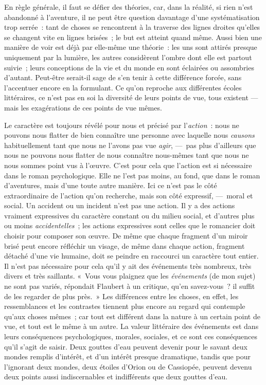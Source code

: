 \documentclass[french,twoside]{book} %
\begin{document}
En règle générale, il faut se défier des théories, car, dans la réalité, si rien n’est abandonné à l’aventure, il ne peut être question davantage d’une systématisation trop serrée : tant de choses se rencontrent à la traverse des lignes droites qu’elles se changent vite en lignes brisées ; le but est atteint quand même. Aussi bien une manière de voir est déjà par elle-même une théorie : les uns sont attirés presque uniquement par la lumière, les autres considèrent l’ombre dont elle est partout suivie ; leurs conceptions de la vie et du monde en sont éclairées ou assombries d’autant. Peut-être serait-il sage de s’en tenir à cette différence forcée, sans l’accentuer encore en la formulant. Ce qu’on reproche aux différentes écoles littéraires, ce n’est pas en soi la diversité de leurs points de vue, tous existent — mais les exagérations de ces points de vue mêmes.\par
Le caractère est toujours révélé pour nous et précisé par l’\emph{action} : nous ne pouvons nous flatter de bien connaître une personne avec laquelle nous \emph{causons} habituellement tant que nous ne l’avons pas vue \emph{agir}, — pas plus d’ailleurs que nous ne pouvons nous flatter de nous connaître nous-mêmes tant que nous ne nous sommes point vus à l’œuvre. C’est pour cela que l’action est si nécessaire dans le roman psychologique. Elle ne l’est pas moins, au fond, que dans le roman d’aventures, mais d’une toute autre manière. Ici ce n’est pas le côté extraordinaire de l’action qu’on recherche, mais son côté expressif, — moral et social. Un accident ou un incident n’est pas une action. Il y a des actions vraiment expressives du caractère constant ou du milieu social, et d’autres plus ou moins \emph{accidentelles} ; les actions expressives sont celles que le romancier doit choisir pour composer son œuvre. De même que chaque fragment d’un miroir brisé peut encore réfléchir un visage, de même dans chaque action, fragment détaché d’une vie humaine, doit se peindre en raccourci un caractère tout entier. Il n’est pas nécessaire pour cela qu’il y ait des événements très nombreux, très divers et très saillants. « Vous vous plaignez que les \emph{événements} (de mon sujet) ne sont pas variés, répondait Flaubert à un critique, qu’en savez-vous ? il suffit de les regarder de plus près. » Les différences entre les choses, en effet, les ressemblances et les contrastes tiennent plus encore au regard qui contemple qu’aux choses mêmes ; car tout est différent dans la nature à un certain point de vue, et tout est le même à un autre. La valeur littéraire des événements est dans leurs conséquences psychologiques, morales, sociales, et ce sont ces conséquences qu’il s’agit de saisir. Deux gouttes d’eau peuvent devenir pour le savant deux mondes remplis d’intérêt, et d’un intérêt presque dramatique, tandis que pour l’ignorant deux mondes, deux étoiles d’Orion ou de Cassiopée, peuvent devenu deux points aussi indiscernables et indifférents que deux gouttes d’eau.\par
\end{document}
